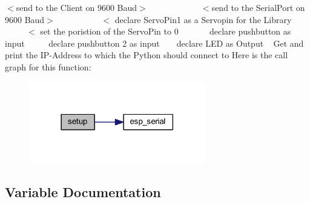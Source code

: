 $<$send to the Client on 9600 Baud$>$ ~\newline
~\newline
~\newline
~\newline
~\newline
~\newline
~\newline
 $<$send to the Serial\+Port on 9600 Baud$>$ ~\newline
~\newline
~\newline
~\newline
~\newline
~\newline
 $<$ declare Servo\+Pin1 as a Servopin for the Library ~\newline
~\newline
~\newline
~\newline
~\newline
 $<$ set the poristion of the Servo\+Pin to 0 ~\newline
~\newline
~\newline
~\newline
 declare pushbutton as input ~\newline
~\newline
~\newline
 declare pushbutton 2 as input ~\newline
~\newline
 declare L\+ED as Output ~\newline
 Get and print the I\+P-\/\+Address to which the Python should connect to Here is the call graph for this function\+:
\nopagebreak
\begin{figure}[H]
\begin{center}
\leavevmode
\includegraphics[width=218pt]{_arduinopart_8ino_a4fc01d736fe50cf5b977f755b675f11d_cgraph}
\end{center}
\end{figure}


\subsection{Variable Documentation}
\mbox{\label{_arduinopart_8ino_acb85827c057a298dc883f002985f7abf}} 
